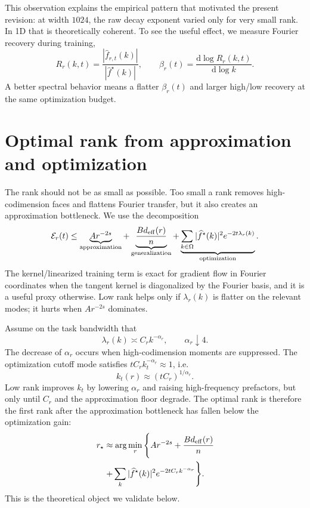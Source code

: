 \documentclass[10pt,twocolumn]{article}
\newcommand{\1}{\mathbf{1}}
\newcommand{\cE}{\mathcal{E}}
\newcommand{\wh}{\widehat}
\newcommand{\dd}{\mathrm{d}}
\begin{document}
This observation explains the empirical pattern that motivated the present revision: at width $1024$, the raw decay exponent varied only for very small rank.  In 1D that is theoretically coherent.  To see the useful effect, we measure Fourier recovery during training,
\begin{equation}\label{eq:recovery}
R_r(k,t)=\frac{|\wh f_{r,t}(k)|}{|\wh f^\star(k)|},
\qquad
\beta_r(t)=\frac{\dd\log R_r(k,t)}{\dd\log k}.
\end{equation}
A better spectral behavior means a flatter $\beta_r(t)$ and larger high/low recovery at the same optimization budget.

\section{Optimal rank from approximation and optimization}
The rank should not be as small as possible.  Too small a rank removes high-codimension faces and flattens Fourier transfer, but it also creates an approximation bottleneck.  We use the decomposition
\begin{equation}\label{eq:totalrisk}
\cE_r(t)\le
\underbrace{A r^{-2s}}_{\rm approximation}
+\underbrace{\frac{B d_{\rm eff}(r)}{n}}_{\rm generalization}
+\underbrace{\sum_{k\in\Omega}|\wh f^\star(k)|^2 e^{-2t\lambda_r(k)}}_{\rm optimization}.
\end{equation}
The kernel/linearized training term is exact for gradient flow in Fourier coordinates when the tangent kernel is diagonalized by the Fourier basis, and it is a useful proxy otherwise.  Low rank helps only if $\lambda_r(k)$ is flatter on the relevant modes; it hurts when $A r^{-2s}$ dominates.

Assume on the task bandwidth that
\begin{equation}\label{eq:lambdar}
\lambda_r(k)\asymp C_r k^{-\alpha_r},\qquad
\alpha_r\downarrow 4.
\end{equation}
The decrease of $\alpha_r$ occurs when high-codimension moments are suppressed.  The optimization cutoff mode satisfies $t C_r k_t^{-\alpha_r}\approx1$, i.e.
\begin{equation}\label{eq:cutoff}
k_t(r)\approx (t C_r)^{1/\alpha_r}.
\end{equation}
Low rank improves $k_t$ by lowering $\alpha_r$ and raising high-frequency prefactors, but only until $C_r$ and the approximation floor degrade.  The optimal rank is therefore the first rank after the approximation bottleneck has fallen below the optimization gain:
\begin{multline}\label{eq:optcondition}
r_\star\approx\arg\min_r
\Bigg\{ A r^{-2s}+\frac{B d_{\rm eff}(r)}{n}\\
+\sum_k |\wh f^\star(k)|^2e^{-2t C_r k^{-\alpha_r}}\Bigg\}.
\end{multline}
This is the theoretical object we validate below.
\end{document}
